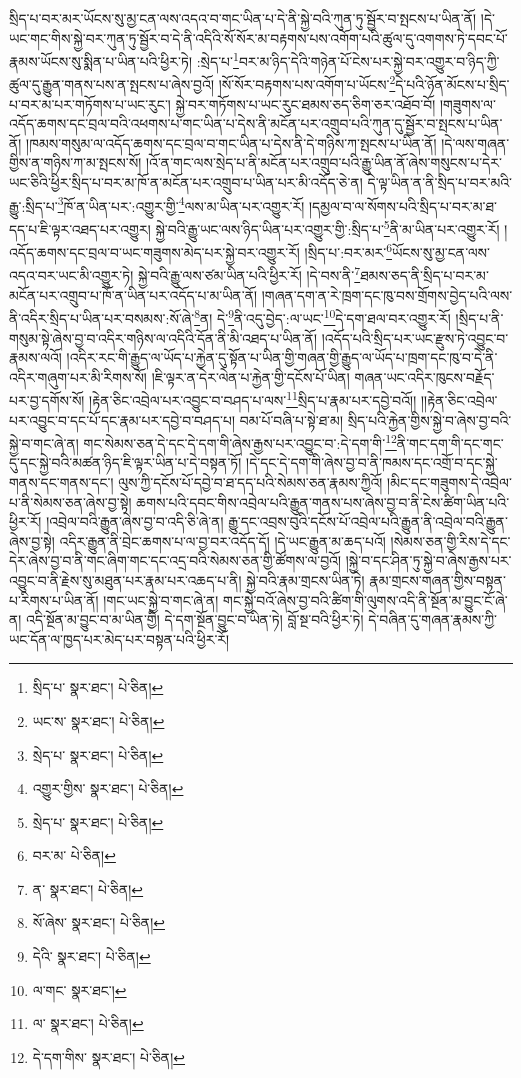 སྲིད་པ་བར་མར་ཡོངས་སུ་མྱ་ངན་ལས་འདའ་བ་གང་ཡིན་པ་དེ་ནི་སྐྱེ་བའི་ཀུན་ཏུ་སྦྱོར་བ་སྤངས་པ་ཡིན་ནོ། །དེ་ཡང་གང་གིས་སྐྱེ་བར་ཀུན་ཏུ་སྦྱོར་བ་དེ་ནི་འདིའི་སོ་སོར་མ་བརྟགས་པས་འགོག་པའི་ཚུལ་དུ་འགགས་ཏེ་དབང་པོ་རྣམས་ཡོངས་སུ་སྨིན་པ་ཡིན་པའི་ཕྱིར་ཏེ། :སྲེད་པ་\footnote{སྲིད་པ་  སྣར་ཐང་།  པེ་ཅིན། }བར་མ་ཉིད་དེའི་གཉེན་པོ་ངེས་པར་སྐྱེ་བར་འགྱུར་བ་ཉིད་ཀྱི་ཚུལ་དུ་རྒྱུན་གནས་པས་ན་སྤངས་པ་ཞེས་བྱའོ། །སོ་སོར་བརྟགས་པས་འགོག་པ་ཡོངས་\footnote{ཡང་ས་  སྣར་ཐང་།  པེ་ཅིན། }དེ་པའི་ཉོན་མོངས་པ་སྲིད་པ་བར་མ་པར་གཏོགས་པ་ཡང་རུང་། སྐྱེ་བར་གཏོགས་པ་ཡང་རུང་ཐམས་ཅད་ཅིག་ཅར་འཐོབ་བོ། །གཟུགས་ལ་འདོད་ཆགས་དང་བྲལ་བའི་འཕགས་པ་གང་ཡིན་པ་དེས་ནི་མངོན་པར་འགྲུབ་པའི་ཀུན་དུ་སྦྱོར་བ་སྤངས་པ་ཡིན་ནོ། །ཁམས་གསུམ་ལ་འདོད་ཆགས་དང་བྲལ་བ་གང་ཡིན་པ་དེས་ནི་དེ་གཉིས་ཀ་སྤངས་པ་ཡིན་ནོ། །དེ་ལས་གཞན་གྱིས་ན་གཉིས་ཀ་མ་སྤངས་སོ། །འོ་ན་གང་ལས་སྲེད་པ་ནི་མངོན་པར་འགྲུབ་པའི་རྒྱུ་ཡིན་ནོ་ཞེས་གསུངས་པ་དེར་ཡང་ཅིའི་ཕྱིར་སྲིད་པ་བར་མ་ཁོ་ན་མངོན་པར་འགྲུབ་པ་ཡིན་པར་མི་འདོད་ཅེ་ན། དེ་ལྟ་ཡིན་ན་ནི་སྲིད་པ་བར་མའི་རྒྱུ་:སྲིད་པ་\footnote{སྲེད་པ་  སྣར་ཐང་།  པེ་ཅིན། }ཁོ་ན་ཡིན་པར་:འགྱུར་གྱི་\footnote{འགྱུར་གྱིས་  སྣར་ཐང་།  པེ་ཅིན། }ལས་མ་ཡིན་པར་འགྱུར་རོ། །དམྱལ་བ་ལ་སོགས་པའི་སྲིད་པ་བར་མ་ཐ་དད་པ་ཇི་ལྟར་འཐད་པར་འགྱུར། སྐྱེ་བའི་རྒྱུ་ཡང་ལས་ཉིད་ཡིན་པར་འགྱུར་གྱི་:སྲིད་པ་\footnote{སྲེད་པ་  སྣར་ཐང་།  པེ་ཅིན། }ནི་མ་ཡིན་པར་འགྱུར་རོ། །འདོད་ཆགས་དང་བྲལ་བ་ཡང་གཟུགས་མེད་པར་སྐྱེ་བར་འགྱུར་རོ། །སྲིད་པ་:བར་མར་\footnote{བར་མ་  པེ་ཅིན། }ཡོངས་སུ་མྱ་ངན་ལས་འདའ་བར་ཡང་མི་འགྱུར་ཏེ། སྐྱེ་བའི་རྒྱུ་ལས་ཙམ་ཡིན་པའི་ཕྱིར་རོ། །དེ་བས་ནི་\footnote{ན་  སྣར་ཐང་།  པེ་ཅིན། }ཐམས་ཅད་ནི་སྲིད་པ་བར་མ་མངོན་པར་འགྲུབ་པ་ཁོ་ན་ཡིན་པར་འདོད་པ་མ་ཡིན་ནོ། །གཞན་དག་ན་རེ་ཁྲག་དང་ཁུ་བས་གྲོགས་བྱེད་པའི་ལས་ནི་འདིར་སྲིད་པ་ཡིན་པར་བསམས་:སོ་ཞེ་\footnote{སོ་ཞེས་  སྣར་ཐང་།  པེ་ཅིན། }ན། དེ་\footnote{དེའི་  སྣར་ཐང་།  པེ་ཅིན། }ནི་འདུ་བྱེད་:ལ་ཡང་\footnote{ལ་གང་  སྣར་ཐང་། }དེ་དག་ཐལ་བར་འགྱུར་རོ། །སྲིད་པ་ནི་གསུམ་སྟེ་ཞེས་བྱ་བ་འདིར་གཉིས་ལ་འདིའི་དོན་ནི་མི་འཐད་པ་ཡིན་ནོ། །འདོད་པའི་སྲིད་པར་ཡང་རྫུས་ཏེ་འབྱུང་བ་རྣམས་ལའོ། །འདིར་རང་གི་རྒྱུད་ལ་ཡོད་པ་རྐྱེན་དུ་སྟོན་པ་ཡིན་གྱི་གཞན་གྱི་རྒྱུད་ལ་ཡོད་པ་ཁྲག་དང་ཁུ་བ་དེ་ནི་འདིར་གཞུག་པར་མི་རིགས་སོ། །ཇི་ལྟར་ན་དེར་ལེན་པ་རྐྱེན་གྱི་དངོས་པོ་ཡིན། གཞན་ཡང་འདིར་ཁུངས་བརྗོད་པར་བྱ་དགོས་སོ། །རྟེན་ཅིང་འབྲེལ་པར་འབྱུང་བ་བཤད་པ་ལས་\footnote{ལ་  སྣར་ཐང་།  པེ་ཅིན། }སྲིད་པ་རྣམ་པར་དབྱེ་བའོ།། །།རྟེན་ཅིང་འབྲེལ་པར་འབྱུང་བ་དང་པོ་དང་རྣམ་པར་དབྱེ་བ་བཤད་པ། བམ་པོ་བཞི་པ་སྟེ་ཐ་མ། སྲིད་པའི་རྐྱེན་གྱིས་སྐྱེ་བ་ཞེས་བྱ་བའི་སྐྱེ་བ་གང་ཞེ་ན། གང་སེམས་ཅན་དེ་དང་དེ་དག་གི་ཞེས་རྒྱས་པར་འབྱུང་བ་:དེ་དག་གི་\footnote{དེ་དག་གིས་  སྣར་ཐང་།  པེ་ཅིན། }ནི་གང་དག་གི་དང་གང་དུ་དང་སྐྱེ་བའི་མཚན་ཉིད་ཇི་ལྟར་ཡིན་པ་དེ་བསྟན་ཏོ། །དེ་དང་དེ་དག་གི་ཞེས་བྱ་བ་ནི་ཁམས་དང་འགྲོ་བ་དང་སྐྱེ་གནས་དང་གནས་དང་། ལུས་ཀྱི་དངོས་པོ་དབྱེ་བ་ཐ་དད་པའི་སེམས་ཅན་རྣམས་ཀྱིའོ། །མིང་དང་གཟུགས་དེ་འབྲེལ་པ་ནི་སེམས་ཅན་ཞེས་བྱ་སྟེ། ཆགས་པའི་དབང་གིས་འབྲེལ་པའི་རྒྱུན་གནས་པས་ཞེས་བྱ་བ་ནི་ངེས་ཚིག་ཡིན་པའི་ཕྱིར་རོ། །འབྲེལ་བའི་རྒྱུན་ཞེས་བྱ་བ་འདི་ཅི་ཞེ་ན། རྒྱུ་དང་འབྲས་བུའི་དངོས་པོ་འབྲེལ་པའི་རྒྱུན་ནི་འབྲེལ་བའི་རྒྱུན་ཞེས་བྱ་སྟེ། འདིར་རྒྱུན་ནི་བྲེང་ཆགས་པ་ལ་བྱ་བར་འདོད་དོ། །དེ་ཡང་རྒྱུན་མ་ཆད་པའོ། །སེམས་ཅན་གྱི་རིས་དེ་དང་དེར་ཞེས་བྱ་བ་ནི་གང་ཞིག་གང་དང་འདྲ་བའི་སེམས་ཅན་གྱི་ཚོགས་ལ་བྱའོ། །སྐྱེ་བ་དང་ཤིན་ཏུ་སྐྱེ་བ་ཞེས་རྒྱས་པར་འབྱུང་བ་ནི་རྗེས་སུ་མཐུན་པར་རྣམ་པར་འཆད་པ་ནི། སྐྱེ་བའི་རྣམ་གྲངས་ཡིན་ཏེ། རྣམ་གྲངས་གཞན་གྱིས་བསྟན་པ་རིགས་པ་ཡིན་ནོ། །གང་ཡང་སྐྱེ་བ་གང་ཞེ་ན། གང་སྐྱེ་བའོ་ཞེས་བྱ་བའི་ཚིག་གི་ལུགས་འདི་ནི་སྔོན་མ་བྱུང་ངོ་ཞེ་ན། འདི་སྔོན་མ་བྱུང་བ་མ་ཡིན་གྱི། དེ་དག་སྔོན་བྱུང་བ་ཡིན་ཏེ། བློ་སྔ་བའི་ཕྱིར་ཏེ། དེ་བཞིན་དུ་གཞན་རྣམས་ཀྱི་ཡང་དོན་ལ་ཁྱད་པར་མེད་པར་བསྟན་པའི་ཕྱིར་རོ། 